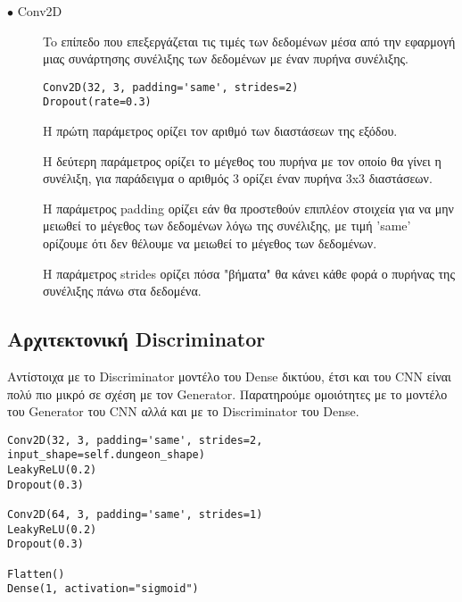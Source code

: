 \begin{description}
\item[$\bullet$ Conv2D] To επίπεδο που επεξεργάζεται τις τιμές των δεδομένων μέσα από την εφαρμογή μιας συνάρτησης συνέλιξης των δεδομένων με έναν πυρήνα συνέλιξης. \cite{conv2d}
\par
\begin{verbatim}
Conv2D(32, 3, padding='same', strides=2)
Dropout(rate=0.3)
\end{verbatim}
\par
Η πρώτη παράμετρος ορίζει τον αριθμό των διαστάσεων της εξόδου.
\par
Η δεύτερη παράμετρος ορίζει το μέγεθος του πυρήνα με τον οποίο θα γίνει η συνέλιξη, για παράδειγμα ο αριθμός 3 ορίζει έναν πυρήνα 3x3 διαστάσεων.
\par
H παράμετρος padding ορίζει εάν θα προστεθούν επιπλέον στοιχεία για να μην μειωθεί το μέγεθος των δεδομένων λόγω της συνέλιξης, με τιμή 'same' ορίζουμε ότι δεν θέλουμε να μειωθεί το μέγεθος των δεδομένων.
\par
H παράμετρος strides ορίζει πόσα "βήματα" θα κάνει κάθε φορά ο πυρήνας της συνέλιξης πάνω στα δεδομένα.
\end{description}


\subsection{Αρχιτεκτονική Discriminator}
Αντίστοιχα με το Discriminator μοντέλο του Dense δικτύου, έτσι και του CNN είναι πολύ πιο μικρό σε σχέση με τον Generator. Παρατηρούμε ομοιότητες με το μοντέλο του Generator του CNN αλλά και με το Discriminator του Dense.

\begin{verbatim}
Conv2D(32, 3, padding='same', strides=2, input_shape=self.dungeon_shape)
LeakyReLU(0.2)
Dropout(0.3)

Conv2D(64, 3, padding='same', strides=1)
LeakyReLU(0.2)
Dropout(0.3)

Flatten()
Dense(1, activation="sigmoid")

\end{verbatim}



